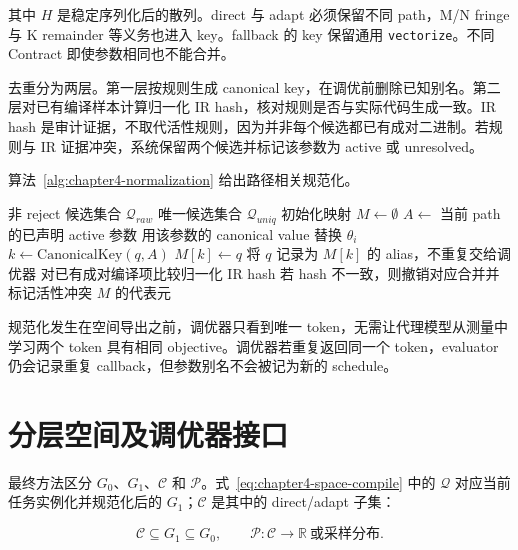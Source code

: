 其中 $H$ 是稳定序列化后的散列。direct 与 adapt 必须保留不同 path，M/N fringe 与 K remainder 等义务也进入 key。fallback 的 key 保留通用 \texttt{vectorize}。不同 Contract 即使参数相同也不能合并。

去重分为两层。第一层按规则生成 canonical key，在调优前删除已知别名。第二层对已有编译样本计算归一化 IR hash，核对规则是否与实际代码生成一致。IR hash 是审计证据，不取代活性规则，因为并非每个候选都已有成对二进制。若规则与 IR 证据冲突，系统保留两个候选并标记该参数为 active 或 unresolved。

算法~\ref{alg:chapter4-normalization} 给出路径相关规范化。

\begin{algorithm}[!htbp]
  \caption{路径相关参数活性分析与候选规范化}
  \label{alg:chapter4-normalization}
  \begin{algorithmic}[1]
    \Require 非 reject 候选集合 $\mathcal{Q}_{raw}$
    \Ensure 唯一候选集合 $\mathcal{Q}_{uniq}$
    \State 初始化映射 $M\gets\emptyset$
      \State $A\gets$ 当前 path 的已声明 active 参数
        \State 用该参数的 canonical value 替换 $\theta_i$
      \EndFor
      \State $k\gets\mathrm{CanonicalKey}(q,A)$
        \State $M[k]\gets q$
      \Else
        \State 将 $q$ 记录为 $M[k]$ 的 alias，不重复交给调优器
      \EndIf
    \EndFor
    \State 对已有成对编译项比较归一化 IR hash
    \State 若 hash 不一致，则撤销对应合并并标记活性冲突
    \State \Return $M$ 的代表元
  \end{algorithmic}
\end{algorithm}

规范化发生在空间导出之前，调优器只看到唯一 token，无需让代理模型从测量中学习两个 token 具有相同 objective。调优器若重复返回同一个 token，evaluator 仍会记录重复 callback，但参数别名不会被记为新的 schedule。

\section{分层空间及调优器接口}

最终方法区分 $G_0$、$G_1$、$\mathcal{C}$ 和 $\mathcal{P}$。式~\eqref{eq:chapter4-space-compile} 中的 $\mathcal{Q}$ 对应当前任务实例化并规范化后的 $G_1$；$\mathcal{C}$ 是其中的 direct/adapt 子集：

\begin{equation}
\mathcal{C}\subseteq G_1\subseteq G_0,
\qquad
\mathcal{P}:\mathcal{C}\rightarrow\mathbb{R}\ \text{或采样分布}.
\label{eq:chapter4-space-hierarchy}
\end{equation}

